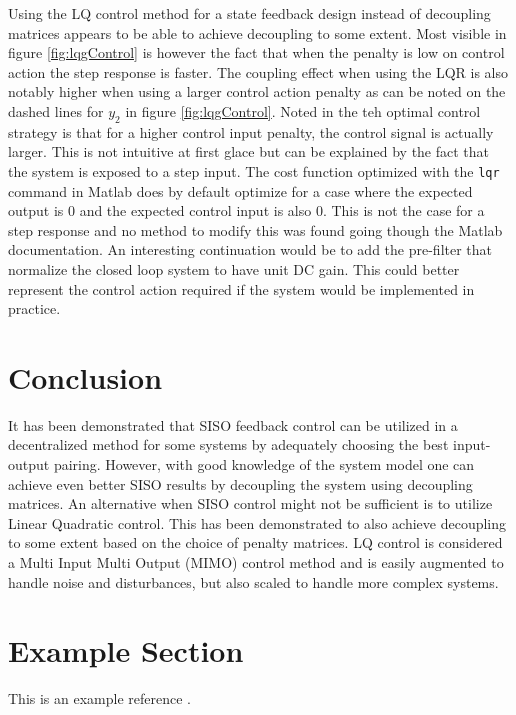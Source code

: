 \documentclass[a4paper, titlepage]{article}
\begin{document}
Using the LQ control method for a state feedback design instead of decoupling matrices appears to be able to achieve decoupling to some extent.
Most visible in figure \ref{fig:lqgControl} is however the fact that when the penalty is low on control action the step response is faster.
The coupling effect when using the LQR is also notably higher when using a larger control action penalty as can be noted on the dashed lines for $y_2$ in figure \ref{fig:lqgControl}.
Noted in the teh optimal control strategy is that for a higher control input penalty, the control signal is actually larger.
This is not intuitive at first glace but can be explained by the fact that the system is exposed to a step input.
The cost function optimized with the \verb|lqr| command in Matlab does by default optimize for a case where the expected output is 0 and the expected control input is also 0.
This is not the case for a step response and no method to modify this was found going though the Matlab documentation.
An interesting continuation would be to add the pre-filter that normalize the closed loop system to have unit DC gain.
This could better represent the control action required if the system would be implemented in practice.

\section{Conclusion}

It has been demonstrated that SISO feedback control can be utilized in a decentralized method for some systems by adequately choosing the best input-output pairing.
However, with good knowledge of the system model one can achieve even better SISO results by decoupling the system using decoupling matrices.
An alternative when SISO control might not be sufficient is to utilize Linear Quadratic control.
This has been demonstrated to also achieve decoupling to some extent based on the choice of penalty matrices.
LQ control is considered a Multi Input Multi Output (MIMO) control method and is easily augmented to handle noise and disturbances, but also scaled to handle more complex systems.



\clearpage


\clearpage
\appendix

\section{Example Section}
This is an example reference \citep{glad00}.



\end{document}
